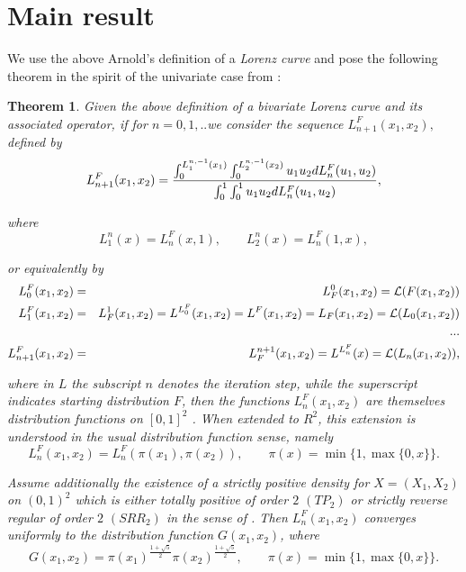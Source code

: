 \documentclass[onecolumn]{article}
\newtheorem{theorem}{Theorem}
\begin{document}
\section{Main result}

We use the above Arnold's definition of a \textit{Lorenz curve} and pose the
following theorem in the spirit of the univariate case from \cite{[3]}:

\begin{theorem}
\label{main-th} Given the above definition of a bivariate \textit{Lorenz
curve} and its associated operator, if for $n=0,1,..$we consider the
sequence $L_{n+1}^{F}(x_{1},x_{2}),$ defined by%
\begin{equation}
L_{n+1}^{F}(x_{1},x_{2})=\frac{\int_{0}^{L_{1}^{n,-1}(x_{1})}%
\int_{0}^{L_{2}^{n,-1}(x_{2})}u_{1}u_{2}dL_{n}^{F}(u_{1},u_{2})}{%
\int_{0}^{1}\int_{0}^{1}u_{1}u_{2}dL_{n}^{F}(u_{1},u_{2})},  \label{5.1}
\end{equation}

where%
\begin{equation}
L_{1}^{n}(x)=L_{n}^{F}(x,1),\qquad L_{2}^{n}(x)=L_{n}^{F}(1,x),  \label{5.11}
\end{equation}

or equivalently by%
\begin{eqnarray}
L_{0}^{F}(x_{1},x_{2}) &=&L_{F}^{0}(x_{1},x_{2})=\mathcal{L(}F(x_{1},x_{2}))
\notag \\
L_{1}^{F}(x_{1},x_{2})
&=&L_{F}^{1}(x_{1},x_{2})=L^{L_{0}^{F}}(x_{1},x_{2})=L^{F}(x_{1},x_{2})=L_{F}(x_{1},x_{2})=%
\mathcal{L(}L_{0}(x_{1},x_{2}))  \notag \\
&&...  \notag \\
L_{n+1}^{F}(x_{1},x_{2}) &=&L_{F}^{n+1}(x_{1},x_{2})=L^{L_{n}^{F}}(x)=%
\mathcal{L}(L_{n}(x_{1},x_{2})),  \label{5}
\end{eqnarray}

where in $L$ the subscript $n$ denotes the iteration step, while the
superscript indicates starting distribution $F$, then the functions $%
L_{n}^{F}(x_{1},x_{2})$ are themselves distribution functions on $[0,1]^{2}$%
. When extended to $R^{2}$, this extension is understood in the usual
distribution function sense, namely 
\begin{equation*}
L_{n}^{F}(x_{1},x_{2})=L_{n}^{F}(\pi (x_{1}),\pi (x_{2})),\qquad \pi
(x)=\min \{1,\max \{0,x\}\}.
\end{equation*}

Assume additionally the existence of a strictly positive density for $%
X=(X_{1},X_{2})$ on $(0,1)^{2}$ which is either totally positive of order $2$
$(TP_{2})$ or strictly reverse regular of order $2$ $(SRR_{2})$ in the sense
of \cite{[36]}. Then $L_{n}^{F}(x_{1},x_{2})$ converges uniformly to the
distribution function $G(x_{1},x_{2})$, where 
\begin{equation}
G(x_{1},x_{2})=\pi (x_{1})^{\frac{1+\sqrt{5}}{2}}\pi (x_{2})^{\frac{1+\sqrt{5%
}}{2}},\qquad \pi (x)=\min \{1,\max \{0,x\}\}.  \label{6}
\end{equation}
\end{theorem}
\end{document}
